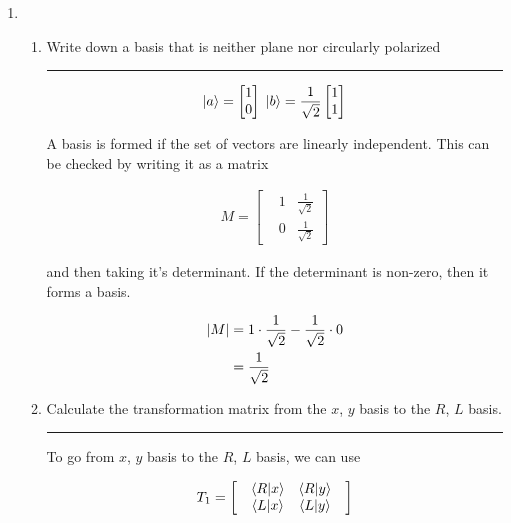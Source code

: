 \documentclass[12pt, oneside]{article}
\newenvironment{answer}
  {\vspace*{0.2cm} \rule{12cm}{0.02cm} \vspace*{0.2cm}}
  {\vspace*{0.2cm}}
\begin{document}
\begin{enumerate}
  \item
  \begin{enumerate}
    \item Write down a basis that is neither plane nor circularly polarized \label{basis}

    \begin{answer}
      \begin{align*}
        \ket{a} = \begin{bmatrix}1 \\  0\end{bmatrix} \; \ket{b} = \frac{1}{\sqrt{2}}\begin{bmatrix}1 \\  1\end{bmatrix}
      \end{align*}

      A basis is formed if the set of vectors are linearly independent. This can be checked by writing it as a matrix

      \begin{align*}
        M = \begin{bmatrix}&1 &\frac{1}{\sqrt{2}}\\ &0 &\frac{1}{\sqrt{2}}\end{bmatrix}
      \end{align*}
    \end{answer}

    and then taking it's determinant. If the determinant is non-zero, then it forms a basis.

    \begin{align*}
      \abs{M} &= 1 \cdot \frac{1}{\sqrt{2}} - \frac{1}{\sqrt{2}} \cdot 0 \\
              &= \frac{1}{\sqrt{2}}
    \end{align*}

    \item Calculate the transformation matrix from the $x$, $y$ basis to the $R$, $L$ basis. \label{transformation1}

    \begin{answer}
      To go from $x$, $y$ basis to the $R$, $L$ basis, we can use

      \begin{align*}
        T_1 = \begin{bmatrix}
                &\bra{R}\ket{x} &\bra{R}\ket{y} &\\
                &\bra{L}\ket{x} &\bra{L}\ket{y} &
              \end{bmatrix}
      \end{align*}


\end{answer}
\end{enumerate}
\end{enumerate}
\end{document}
